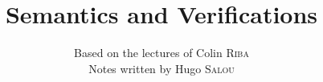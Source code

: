 \documentclass{../notes-en}
\title{Semantics and Verifications}
\author{Based on the lectures of Colin \textsc{Riba} \\ Notes written by Hugo \textsc{Salou}}
\begin{document}
  \maketitle

  \dominitoc
  \tableofcontents

  \pagebreak

  
  
  
\end{document}
